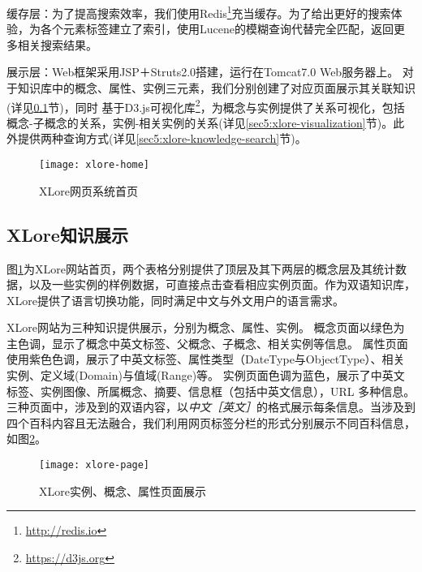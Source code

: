 
{\heiti 缓存层：}为了提高搜索效率，我们使用Redis\footnote{\url{http://redis.io}}充当缓存。为了给出更好的搜索体验，为各个元素标签建立了索引，使用Lucene的模糊查询代替完全匹配，返回更多相关搜索结果。

{\heiti 展示层：}Web框架采用JSP＋Struts2.0搭建，运行在Tomcat7.0 Web服务器上。
对于知识库中的概念、属性、实例三元素，我们分别创建了对应页面展示其关联知识(详见\ref{sec5:xlore-knowledge-representation}节)，同时
基于D3.js可视化库\footnote{\url{https://d3js.org}}，为概念与实例提供了关系可视化，包括概念-子概念的关系，实例-相关实例的关系(详见\ref{sec5:xlore-visualization}节)。此外提供两种查询方式(详见\ref{sec5:xlore-knowledge-search}节)。

\begin{figure}[ht]
  \centering
  \texttt{[image: xlore-home]}
  \caption{XLore网页系统首页}
  \label{fig:xlore-home}
\end{figure}

\subsection{XLore知识展示}
\label{sec5:xlore-knowledge-representation}
图\ref{fig:xlore-home}为XLore网站首页，两个表格分别提供了顶层及其下两层的概念层及其统计数据，以及一些实例的样例数据，可直接点击查看相应实例页面。作为双语知识库，XLore提供了语言切换功能，同时满足中文与外文用户的语言需求。

XLore网站为三种知识提供展示，分别为概念、属性、实例。
概念页面以绿色为主色调，显示了概念中英文标签、父概念、子概念、相关实例等信息。
属性页面使用紫色色调，展示了中英文标签、属性类型（DateType与ObjectType）、相关实例、定义域(Domain)与值域(Range)等。
实例页面色调为蓝色，展示了中英文标签、实例图像、所属概念、摘要、信息框（包括中英文信息），URL 多种信息。三种页面中，涉及到的双语内容，以\textit{中文［英文］}的格式展示每条信息。当涉及到四个百科内容且无法融合，我们利用网页标签分栏的形式分别展示不同百科信息，如图\ref{fig:xlore-page}。

\begin{figure}[ht]
  \centering
  \texttt{[image: xlore-page]}
  \caption{XLore实例、概念、属性页面展示}
  \label{fig:xlore-page}
\end{figure}


